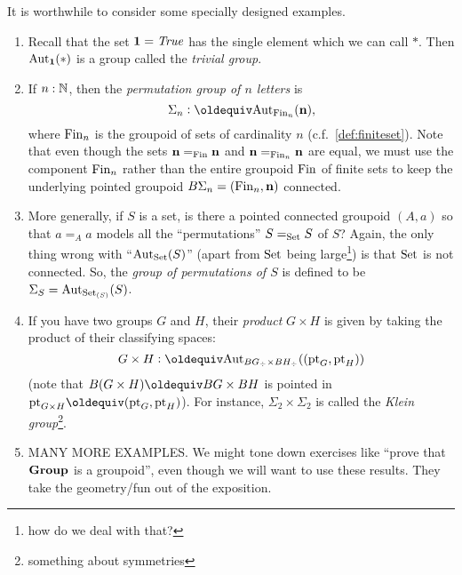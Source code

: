 \begin{example}
  It is worthwhile to consider some specially designed examples.
  \begin{enumerate}
  \item Recall that the set $\mathbf 1=\mathop{\mathit{True}}$ has the single element which we can call $*$. Then $\mathrm{Aut}_{\mathbf 1}(*)$ is a group called the \emph{trivial group}.
  \item If $n:\mathbb{N}$, then the \emph{permutation group of $n$ letters} is 
$$\Sigma_n\defequi\aut_{\fin_n}(\mathbf n),$$ 
where $\mathrm{Fin}_n$ is the groupoid of sets of cardinality $n$ (c.f.~\ref{def:finiteset}).  Note that even though the sets $\mathbf n=_{\mathrm{Fin}}\mathbf n$ and $\mathbf n=_{\mathrm{Fin}_n}\mathbf n$ are equal, we must use the component $\mathrm{Fin}_n$ rather than the entire groupoid $\mathrm{Fin}$ of finite sets to keep the underlying pointed groupoid $B\Sigma_n=(\mathrm{Fin}_n,\mathbf n)$ connected.
  \item More generally, if $S$ is a set, is there a pointed connected groupoid $(A,a)$ so that $a=_Aa$ models all the ``permutations'' $S=_{\mathord{\mathrm{Set}}}S$ of $S$?  Again, the only thing wrong with ``$\mathrm{Aut}_{\mathord{\mathrm{Set}}}(S)$'' (apart from $\mathord{\mathrm{Set}}$ being large\footnote{how do we deal with that?}) is that $\mathord{\mathrm{Set}}$ is not connected. 
%
 So, 
the \emph{group of permutations of $S$} is defined to be $\Sigma_{S}=\mathrm{Aut}_{\mathord{\mathrm{Set}}_{(S)}}(S)$.  
\item If you have two groups $G$ and $H$, their {\em product} $G\times H$ is given by taking the product of their classifying spaces:
$$G\times H\defequi\aut_{BG_\div\times BH_\div}((\pt_G,\pt_H))$$
(note that $B(G\times H)\oldequiv BG\times BH$ is pointed in $\pt_{G\times H}\oldequiv(\pt_G,\pt_H)$).  
For instance, $\Sigma_2\times\Sigma_2$ is called the {\em Klein group}\footnote{something about symmetries}.
\item MANY MORE EXAMPLES.  We might tone down exercises like ``prove that $\mathbf{Group}$ is a groupoid'', even though we will want to use these results.  They take the geometry/fun out of the exposition.
  \end{enumerate}
\end{example}
